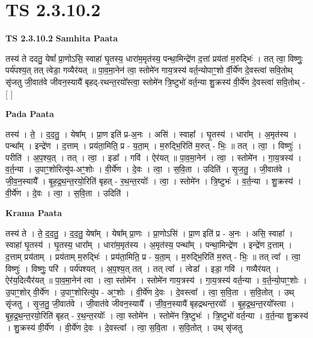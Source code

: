 \documentclass[17pt]{extarticle}
\begin{document}
\section{ TS 2.3.10.2 }

\textbf{TS 2.3.10.2 } \newline
\textbf{Samhita Paata} \newline

तस्य॑ ते ददतु॒ येषां᳚ प्रा॒णोऽसि॒ स्वाहा॑ घृ॒तस्य॒ धारा॑म॒मृत॑स्य॒ पन्था॒मिन्द्रे॑ण द॒त्तां प्रय॑तां म॒रुद्भिः॑ । तत् त्वा॒ विष्णुः॒ पर्य॑पश्य॒त् तत् त्वेडा॒ गव्यैर॑यत् ॥ पा॒व॒मा॒नेन॑ त्वा॒ स्तोमे॑न गाय॒त्रस्य॑ वर्त॒न्योपाꣳ॒॒शो र्वी॒र्ये॑ण दे॒वस्त्वा॑ सवि॒तोथ् सृ॑जतु जी॒वात॑वे जीवन॒स्यायै॑ बृहद्-रथन्त॒रयो᳚स्त्वा॒ स्तोमे॑न त्रि॒ष्टुभो॑ वर्त॒न्या शु॒क्रस्य॑ वी॒र्ये॑ण दे॒वस्त्वा॑ सवि॒तोथ् - [  ] \newline

\textbf{Pada Paata} \newline

तस्य॑ । ते॒ । द॒द॒तु॒ । येषा᳚म् । प्रा॒ण इति॑ प्र-अ॒नः । असि॑ । स्वाहा᳚ । घृ॒तस्य॑ । धारा᳚म् । अ॒मृत॑स्य । पन्था᳚म् । इन्द्रे॑ण । द॒त्ताम् । प्रय॑ता॒मिति॒ प्र - य॒ता॒म् । म॒रुद्भि॒रिति॑ म॒रुत् - भिः॒ ॥ तत् । त्वा॒ । विष्णुः॑ । परीति॑ । अ॒प॒श्य॒त् । तत् । त्वा॒ । इडा᳚ । गवि॑ । ऐर॑यत् ॥ पा॒व॒मा॒नेन॑ । त्वा॒ । स्तोमे॑न । गा॒य॒त्रस्य॑ । व॒र्त॒न्या । उ॒पाꣳ॒॒शोरित्यु॑प-अꣳ॒॒शोः । वी॒र्ये॑ण । दे॒वः । त्वा॒ । स॒वि॒ता । उदिति॑ । सृ॒ज॒तु॒ । जी॒वात॑वे । जी॒व॒न॒स्यायै᳚ । बृ॒ह॒द्र॒थ॒न्त॒रयो॒रिति॑ बृहत् - र॒थ॒न्त॒रयोः᳚ । त्वा॒ । स्तोमे॑न । त्रि॒ष्टुभः॑ । व॒र्त॒न्या । शु॒क्रस्य॑ । वी॒र्ये॑ण । दे॒वः । त्वा॒ । स॒वि॒ता । उदिति॑ ।  \newline


\textbf{Krama Paata} \newline

तस्य॑ ते । ते॒ द॒द॒तु॒ । द॒द॒तु॒ येषा᳚म् । येषा᳚म् प्रा॒णः । प्रा॒णोऽसि॑ । प्रा॒ण इति॑ प्र - अ॒नः । असि॒ स्वाहा᳚ । स्वाहा॑ घृ॒तस्य॑ । घृ॒तस्य॒ धारा᳚म् । धारा॑म॒मृत॑स्य । अ॒मृत॑स्य॒ पन्था᳚म् । पन्था॒मिन्द्रे॑ण । इन्द्रे॑ण द॒त्ताम् । द॒त्ताम् प्रय॑ताम् । प्रय॑ताम् म॒रुद्भिः॑ । प्रय॑ता॒मिति॒ प्र - य॒ता॒म् । म॒रुद्भि॒रिति॑ म॒रुत् - भिः॒ ॥ तत् त्वा᳚ । त्वा॒ विष्णुः॑ । विष्णुः॒ परि॑ । पर्य॑पश्यत् । अ॒प॒श्य॒त् तत् । तत् त्वा᳚ । त्वेडा᳚ । इडा॒ गवि॑ । गव्यैर॑यत् । ऐर॑य॒दित्यैर॑यत् ॥ पा॒व॒मा॒नेन॑ त्वा । त्वा॒ स्तोमे॑न । स्तोमे॑न गाय॒त्रस्य॑ । गा॒य॒त्रस्य॑ वर्त॒न्या । व॒र्त॒न्यो॒पाꣳ॒॒शोः । उ॒पाꣳ॒॒शोर् वी॒र्ये॑ण । उ॒पाꣳ॒॒शोरित्यु॑प - अꣳ॒॒शोः । वी॒र्ये॑ण दे॒वः । दे॒वस्त्वा᳚ । त्वा॒ स॒वि॒ता । स॒वि॒तोत् । उथ् सृ॑जतु । सृ॒ज॒तु॒ जी॒वात॑वे । जी॒वात॑वे जीवन॒स्यायै᳚ । जी॒व॒न॒स्यायै॑ बृहद्रथन्त॒रयोः᳚ । बृ॒ह॒द्र॒थ॒न्त॒रयो᳚स्त्वा । बृ॒ह॒द्र॒थ॒न्त॒रयो॒रिति॑ बृहत् - र॒थ॒न्त॒रयोः᳚ । त्वा॒ स्तोमे॑न । स्तोमे॑न त्रि॒ष्टुभः॑ । त्रि॒ष्टुभो॑ वर्त॒न्या । व॒र्त॒न्या शु॒क्रस्य॑ । शु॒क्रस्य॑ वी॒र्ये॑ण । वी॒र्ये॑ण दे॒वः । दे॒वस्त्वा᳚ । त्वा॒ स॒वि॒ता । स॒वि॒तोत् । उथ् सृ॑जतु \newline
\end{document}
